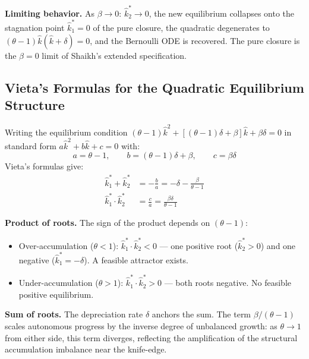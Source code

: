 \textbf{Limiting behavior.} As $\beta \to 0$: $\hat{k}_2^* \to 0$, the new equilibrium collapses onto the stagnation point $\hat{k}_1^* = 0$ of the pure closure, the quadratic degenerates to $(\theta-1)\hat{k}(\hat{k}+\delta) = 0$, and the Bernoulli ODE is recovered. The pure closure is the $\beta = 0$ limit of Shaikh's extended specification.


\subsection{Vieta's Formulas for the Quadratic Equilibrium Structure}
\label{app:vieta}

Writing the equilibrium condition $(\theta-1)\hat{k}^2 + [(\theta-1)\delta + \beta]\hat{k} + \beta\delta = 0$ in standard form $a\hat{k}^2 + b\hat{k} + c = 0$ with:
%
\begin{equation}
	a = \theta - 1, \qquad b = (\theta-1)\delta + \beta, \qquad c = \beta\delta
\end{equation}
%
Vieta's formulas give:
%
\begin{align}
	\hat{k}_1^* + \hat{k}_2^* &= -\frac{b}{a} = -\delta - \frac{\beta}{\theta - 1} \label{eq:app_vieta_sum} \\[6pt]
	\hat{k}_1^* \cdot \hat{k}_2^* &= \frac{c}{a} = \frac{\beta\delta}{\theta - 1} \label{eq:app_vieta_product}
\end{align}

\textbf{Product of roots.} The sign of the product depends on $(\theta - 1)$:
\begin{itemize}
	\item Over-accumulation ($\theta < 1$): $\hat{k}_1^* \cdot \hat{k}_2^* < 0$ — one positive root ($\hat{k}_2^* > 0$) and one negative ($\hat{k}_1^* = -\delta$). A feasible attractor exists.
	\item Under-accumulation ($\theta > 1$): $\hat{k}_1^* \cdot \hat{k}_2^* > 0$ — both roots negative. No feasible positive equilibrium.
\end{itemize}

\textbf{Sum of roots.} The depreciation rate $\delta$ anchors the sum. The term $\beta/(\theta-1)$ scales autonomous progress by the inverse degree of unbalanced growth: as $\theta \to 1$ from either side, this term diverges, reflecting the amplification of the structural accumulation imbalance near the knife-edge.

